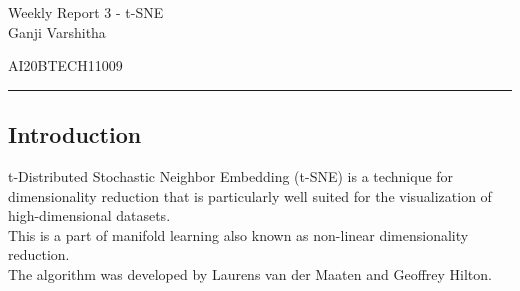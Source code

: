 \documentclass[12pt,letterpaper, onecolumn]{exam}
\begin{document}
\newtheorem{theorem}{Theorem}[section]
\newtheorem{problem}{Problem}
\newtheorem{proposition}{Proposition}[section]
\newtheorem{lemma}{Lemma}[section]
\newtheorem{corollary}[theorem]{Corollary}
\newtheorem{example}{Example}[section]
\newtheorem{definition}[problem]{Definition}

\newcommand{\BEQA}{\begin{eqnarray}}
\newcommand{\EEQA}{\end{eqnarray}}
\newcommand{\define}{\stackrel{\triangle}{=}}

\raggedbottom
\setlength{\parindent}{0pt}
\providecommand{\mbf}{\mathbf}
\providecommand{\norm}[1]{\lVert#1\rVert}
\providecommand{\pr}[1]{\ensuremath{\Pr\left(#1\right)}}
\providecommand{\qfunc}[1]{\ensuremath{Q\left(#1\right)}}
\providecommand{\sbrak}[1]{\ensuremath{{}\left[#1\right]}}
\providecommand{\lsbrak}[1]{\ensuremath{{}\left[#1\right.}}
\providecommand{\rsbrak}[1]{\ensuremath{{}\left.#1\right]}}
\providecommand{\brak}[1]{\ensuremath{\left(#1\right)}}
\providecommand{\lbrak}[1]{\ensuremath{\left(#1\right.}}
\providecommand{\rbrak}[1]{\ensuremath{\left.#1\right)}}
\providecommand{\cbrak}[1]{\ensuremath{\left\{#1\right\}}}
\providecommand{\lcbrak}[1]{\ensuremath{\left\{#1\right.}}
\providecommand{\rcbrak}[1]{\ensuremath{\left.#1\right\}}}
\let\vec\mathbf




\begingroup  
    \centering
    
    \LARGE Weekly Report 3 - t-SNE\\[0.5em]
    
    \large Ganji Varshitha\par
    \large AI20BTECH11009\par
\endgroup
\rule{\textwidth}{0.4pt}
\pointsdroppedatright   %
\printanswers
\newcommand\Solution{
  \textbf{Solution:}\\}
\newcommand{\myvec}[1]{\ensuremath{\begin{bmatrix}#1\end{bmatrix}}}

 \subsection*{Introduction}
t-Distributed Stochastic Neighbor Embedding (t-SNE) is a technique for dimensionality reduction that is particularly well suited for the visualization of high-dimensional datasets.\\
This is a part of manifold learning also known as non-linear dimensionality reduction.\\ The algorithm was developed by Laurens van der Maaten and Geoffrey Hilton.
\end{document}
